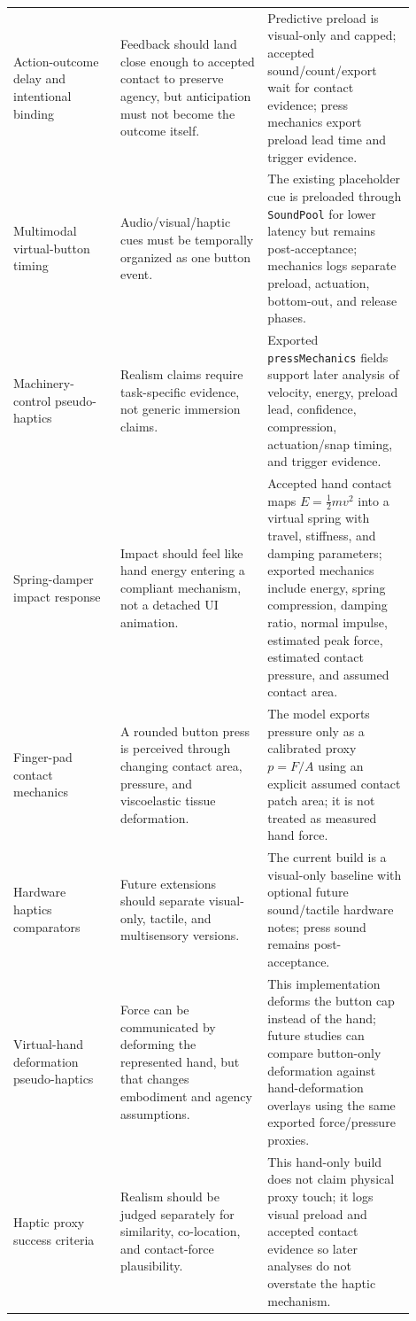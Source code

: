 \documentclass[11pt]{article}
\begin{document}
\begin{longtable}{p{0.24\linewidth}p{0.33\linewidth}p{0.33\linewidth}}
Action-outcome delay and intentional binding & Feedback should land close enough to accepted contact to preserve agency, but anticipation must not become the outcome itself. & Predictive preload is visual-only and capped; accepted sound/count/export wait for contact evidence; press mechanics export preload lead time and trigger evidence. \\
Multimodal virtual-button timing & Audio/visual/haptic cues must be temporally organized as one button event. & The existing placeholder cue is preloaded through \texttt{SoundPool} for lower latency but remains post-acceptance; mechanics logs separate preload, actuation, bottom-out, and release phases. \\
Machinery-control pseudo-haptics & Realism claims require task-specific evidence, not generic immersion claims. & Exported \texttt{pressMechanics} fields support later analysis of velocity, energy, preload lead, confidence, compression, actuation/snap timing, and trigger evidence. \\
Spring-damper impact response & Impact should feel like hand energy entering a compliant mechanism, not a detached UI animation. & Accepted hand contact maps \(E=\frac{1}{2}mv^2\) into a virtual spring with travel, stiffness, and damping parameters; exported mechanics include energy, spring compression, damping ratio, normal impulse, estimated peak force, estimated contact pressure, and assumed contact area. \\
Finger-pad contact mechanics & A rounded button press is perceived through changing contact area, pressure, and viscoelastic tissue deformation. & The model exports pressure only as a calibrated proxy \(p=F/A\) using an explicit assumed contact patch area; it is not treated as measured hand force. \\
Hardware haptics comparators & Future extensions should separate visual-only, tactile, and multisensory versions. & The current build is a visual-only baseline with optional future sound/tactile hardware notes; press sound remains post-acceptance. \\
Virtual-hand deformation pseudo-haptics & Force can be communicated by deforming the represented hand, but that changes embodiment and agency assumptions. & This implementation deforms the button cap instead of the hand; future studies can compare button-only deformation against hand-deformation overlays using the same exported force/pressure proxies. \\
Haptic proxy success criteria & Realism should be judged separately for similarity, co-location, and contact-force plausibility. & This hand-only build does not claim physical proxy touch; it logs visual preload and accepted contact evidence so later analyses do not overstate the haptic mechanism. \\
\bottomrule
\end{longtable}
\end{document}
